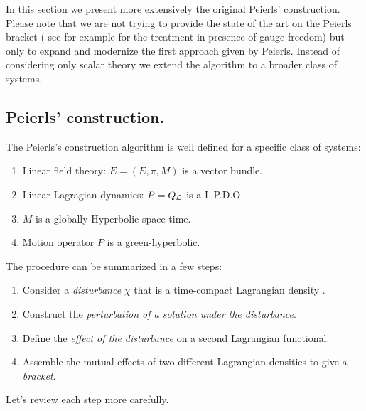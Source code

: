 \documentclass[Main]{subfiles}
\begin{document}
		In this section we present more extensively the original Peierls' construction. 
		Please note that we are not trying to provide the state of the art on the Peierls bracket ( see for example \cite{Khavkine2014} for the treatment in presence of gauge freedom) but only to expand and modernize the first approach given by Peierls.
	Instead of considering only scalar theory we extend the algorithm to a broader class of systems.
	
	\subsection{Peierls' construction.}
	The Peierls's construction algorithm is well defined for a specific class of systems:
		\begin{enumerate}
			\item Linear field theory: $E=(E,\pi,M)$ is a vector bundle.
			\item Linear Lagragian dynamics: $P=Q_{\mathcal{L}}$ is a L.P.D.O.
			\item $M$ is a globally Hyperbolic space-time.
			\item Motion operator $P$ is a green-hyperbolic.
		\end{enumerate}	
	The procedure can be summarized in a few steps:
	\begin{enumerate}
		\item Consider a \emph{disturbance} $\chi$ that is a time-compact Lagrangian density .
		\item Construct the \emph{perturbation of a solution under the disturbance}.
		\item Define the \emph{effect of the disturbance} on a second Lagrangian functional.
		\item Assemble the mutual effects of two different Lagrangian densities to give a \emph{bracket}.
	\end{enumerate}	
	Let's review each step more carefully.
	
\end{document}
